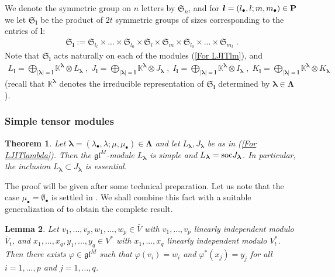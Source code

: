 \documentclass[12pt]{article}
\def\KK {{\mathbb K}}     %
\def\mk {\mathfrak}
\newtheorem{theorem}{Theorem}[section]
\newtheorem{lemma}[theorem]{Lemma}
\begin{document}
We denote the symmetric group on $n$ letters by $\mk S_n$, and for $\bm l=(l_\bullet,l;m,m_\bullet)\in{\bf P}$ we let $\mk S_{\bm l}$ be the product of $2t$ symmetric groups of sizes corresponding to the entries of $\bm l$: 
\begin{gather}\label{For Sll}
\mk S_{\bm l}:=\mk S_{l_t}\times... \times\mk S_{l_0}\times \mk S_l\times \mk S_m\times\mk S_{l_0}\times...\times \mk S_{m_t} \;.
\end{gather}
Note that $\mk S_{\bm l}$ acts naturally on each of the modules (\ref{For LJITlm}), and
\begin{gather}\label{For LJITlm is sum LJITlambdamu}
L_{\bm l} = \bigoplus\limits_{|\bm\lambda|=\bm l} \KK^{\bm \lambda} \otimes L_{\bm\lambda}\;, \; J_{\bm l} = \bigoplus\limits_{|\bm\lambda|=\bm l} \KK^{\bm \lambda} \otimes J_{\bm\lambda} \;,\;
I_{\bm l} = \bigoplus\limits_{|\bm\lambda|=\bm l} \KK^{\bm \lambda} \otimes I_{\bm\lambda} \;,\; K_{\bm l} = \bigoplus\limits_{|\bm\lambda|=\bm l} \KK^{\bm \lambda} \otimes K_{\bm\lambda}
\end{gather}
(recall that $\KK^{\bm\lambda}$ denotes the irreducible representation of $\mk S_{\bm l}$ determined by $\bm\lambda\in\bm\Lambda$).



\subsubsection{Simple tensor modules}


\begin{theorem}\label{Theo Simples and Injhulls}
Let $\bm\lambda=(\lambda_\bullet,\lambda;\mu,\mu_\bullet)\in\bm\Lambda$ and let $L_{\bm\lambda},J_{\bm\lambda}$ be as in (\ref{For LJITlambda}). Then the $\mk{gl}^M$-module $L_{\bm\lambda}$ is simple and $L_{\bm\lambda}={\rm soc}J_{\bm\lambda}$. In particular, the inclusion $L_{\bm\lambda}\subset J_{\bm\lambda}$ is essential.
\end{theorem}

The proof will be given after some technical preparation. Let us note that the case $\mu_\bullet=\emptyset_\bullet$ is settled in \cite[Lemma~4.9]{Chirvasitu-Penkov-RC}. We shall combine this fact with a suitable generalization of \cite[Proposition~4.1 and Corollary~4.3]{Chirvasitu-Penkov-OTC} to obtain the complete result.


\begin{lemma}\label{Lemma First LinIndepToAny}
Let $v_1,...,v_p,w_1,...,w_p\in \bar V$ with $v_1,...,v_p$ linearly independent modulo $\bar V_{t}$, and $x_1,...,x_q,y_1,...,y_q\in V^*$ with $x_1,...,x_q$ linearly independent modulo $V^*_{t}$. Then there exists $\varphi\in\mk{gl}^M$ such that $\varphi(v_i)=w_i$ and $\varphi^*(x_j)=y_j$ for all $i=1,...,p$ and $j=1,...,q$.
\end{lemma}
\end{document}

